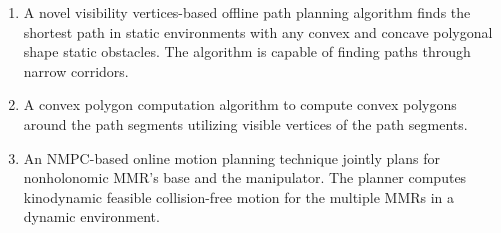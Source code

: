 \begin{enumerate}
	\item A novel visibility vertices-based offline path planning algorithm finds the shortest path in static environments with any convex and concave polygonal shape static obstacles. The algorithm is capable of finding paths through narrow corridors.
	\item A convex polygon computation algorithm to compute convex polygons around the path segments utilizing visible vertices of the path segments.
	\item An NMPC-based online motion planning technique jointly plans for nonholonomic MMR's base and the manipulator. The planner computes kinodynamic feasible collision-free motion for the multiple MMRs in a dynamic environment.
\end{enumerate}
  
